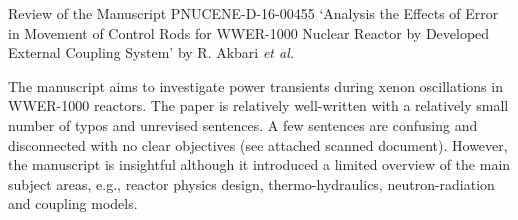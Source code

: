 \documentclass[14pt,twoside]{report}
\begin{document}
\afterpage{%
    \clearpage%
    \thispagestyle{empty}%
    \begin{landscape}%
        \centering %
        \vfill
    \end{landscape}
    \clearpage%
}
\vfill
\clearpage



\begin{center}
  {\Large Review of the Manuscript PNUCENE-D-16-00455 `Analysis the Effects of Error in Movement of Control Rods for WWER-1000 Nuclear Reactor by Developed External Coupling System' by R. Akbari {\it et al.}}
\end{center}

\medskip

The manuscript aims to investigate power transients during xenon oscillations in WWER-1000 reactors. The paper is relatively well-written with a relatively small number of typos and unrevised sentences. A few sentences are confusing and disconnected with no clear objectives (see attached scanned document).  However, the manuscript is insightful although it introduced a limited overview of the main subject areas, e.g., reactor physics design, thermo-hydraulics, neutron-radiation and coupling models.
\end{document}
